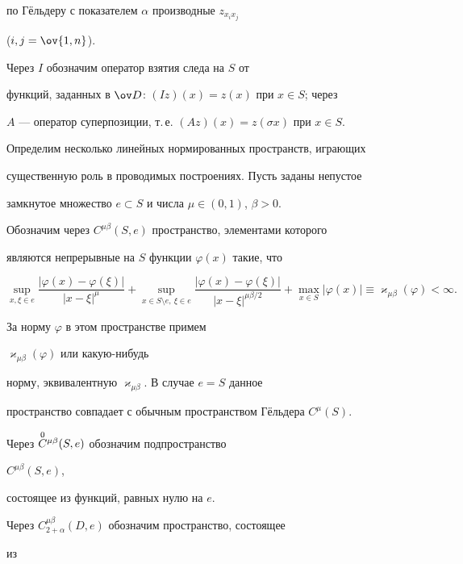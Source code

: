 по Г\"ельдеру с показателем $\alpha$ производные $z_{x_i x_j}$ 


($i,j=\ov{1,n}$). 


 


Через $I$ обозначим оператор взятия следа на $S$ от 


функций, заданных в $\ov D$: $(Iz)(x)=z(x)$ при $x\in S$; через 


$A$ --- оператор суперпозиции, т.\,е. $(Az)(x)=z(\sigma x)$ при $x\in S$. 


 


Определим несколько линейных нормированных пространств, играющих 


существенную роль в проводимых построениях. Пусть заданы непустое 


замкнутое множество $e\subset S$ и числа $\mu\in(0,1)$, $\beta>0$. 


Обозначим через $C^{\mu\beta}(S,e)$ пространство, элементами которого 


являются непрерывные на $S$ функции $\varphi(x)$ такие, что 


$$ 


\sup_{x,\xi\in e}\frac{|\varphi(x)-\varphi(\xi)|} 


{|x-\xi|^\mu}+\sup_{x\in S\setminus e,\ \xi\in e} 


\frac{|\varphi(x)-\varphi(\xi)|}{|x-\xi|^{\mu\beta/2}}+ 


\max_{x\in S}|\varphi(x)|\equiv\varkappa_{\mu\beta} 


(\varphi)<\infty. 


$$ 


За норму $\varphi$ в этом пространстве примем 


$\varkappa_{\mu\beta}(\varphi)$ или какую-нибудь 


норму, эквивалентную $\varkappa_{\mu\beta}$. В случае $e=S$ данное 


пространство совпадает с обычным пространством Г\"ельдера $C^\mu(S)$. 


Через $\overset{0}{C}{}^{\mu\beta}(S,e)$ обозначим подпространство 


$C^{\mu\beta}(S,e)$, 


состоящее из функций, равных нулю на $e$. 


 


Через $C^{\mu\beta}_{2+\alpha}(D,e)$ обозначим пространство, состоящее 


из 


